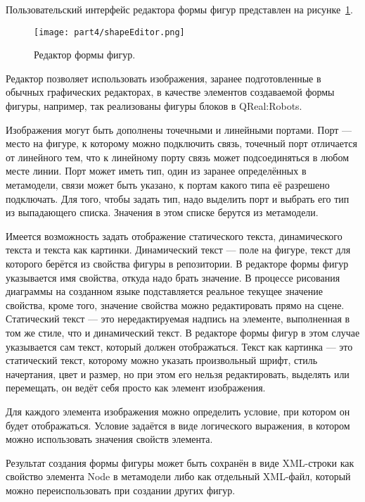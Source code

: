 Пользовательский интерфейс редактора формы фигур представлен на рисунке~\ref{image:shapeEditor}.

\begin{figure} [ht]
	\begin{center}
		\texttt{[image: part4/shapeEditor.png]}
		\caption{Редактор формы фигур.}
		\label{image:shapeEditor}
	\end{center}
\end{figure}

Редактор позволяет использовать изображения, заранее подготовленные в обычных графических 
редакторах, в качестве элементов создаваемой формы фигуры, например, так реализованы 
фигуры блоков в QReal:Robots. 

Изображения могут быть дополнены точечными и линейными портами. Порт --- место на 
фигуре, к которому можно подключить связь, точечный порт отличается от линейного тем, 
что к линейному порту связь может подсоединяться в любом месте линии. Порт может иметь 
тип, один из заранее определённых в метамодели, связи может быть указано, к портам 
какого типа её разрешено подключать. Для того, чтобы задать тип, надо выделить порт 
и выбрать его тип из выпадающего списка. Значения в этом списке берутся из метамодели.

Имеется возможность задать отображение статического текста, динамического текста и 
текста как картинки. Динамический текст --- поле на фигуре, текст для которого берётся 
из свойства фигуры в репозитории. В редакторе формы фигур указывается имя свойства, 
откуда надо брать значение. В процессе рисования диаграммы на созданном языке подставляется 
реальное текущее значение свойства, кроме того, значение свойства можно редактировать 
прямо на сцене. Статический текст --- это нередактируемая надпись на элементе, выполненная 
в том же стиле, что и динамический текст. В редакторе формы фигур в этом случае указывается 
сам текст, который должен отображаться. Текст как картинка --- это статический текст, 
которому можно указать произвольный шрифт, стиль начертания, цвет и размер, но при 
этом его нельзя редактировать, выделять или перемещать, он ведёт себя просто как элемент 
изображения.

Для каждого элемента изображения можно определить условие, при котором он будет отображаться. 
Условие задаётся в виде логического выражения, в котором можно использовать значения 
свойств элемента. 

Результат создания формы фигуры может быть сохранён в виде XML-строки как свойство 
элемента Node в метамодели либо как отдельный XML-файл, который можно переиспользовать 
при создании других фигур.

